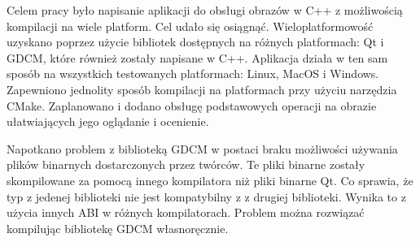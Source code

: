 \par
Celem pracy było napisanie aplikacji do obsługi obrazów \DICOM w C++ z możliwością kompilacji na wiele platform.
Cel udało się osiągnąć.
Wieloplatformowość uzyskano poprzez użycie bibliotek dostępnych na różnych platformach: Qt i GDCM, które również zostały napisane w C++.
Aplikacja działa w ten sam sposób na wszystkich testowanych platformach: Linux, MacOS i Windows.
Zapewniono jednolity sposób kompilacji na platformach przy użyciu narzędzia CMake.
Zaplanowano i dodano obsługę podstawowych operacji na obrazie ułatwiających jego oglądanie i ocenienie.
\par
Napotkano problem z biblioteką GDCM w postaci braku możliwości używania plików binarnych dostarczonych przez twórców.
Te pliki binarne zostały skompilowane za pomocą innego kompilatora niż pliki binarne Qt.
Co sprawia, że typ  z jedenej biblioteki nie jest kompatybilny z  z drugiej biblioteki.
Wynika to z użycia innych ABI w różnych kompilatorach.
Problem można rozwiązać kompilując bibliotekę GDCM własnoręcznie.